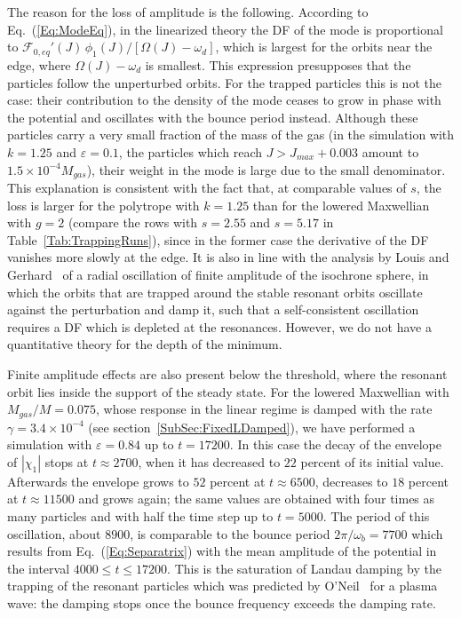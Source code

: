 The reason for the loss of amplitude is the following. According to Eq.~(\ref{Eq:ModeEq}), in the linearized theory the DF of the mode is proportional to $\mathcal{F}_{0,eq}'(J)\,\phi_1(J)/[\Omega(J) - \omega_d]$, which is largest for the orbits near the edge, where $\Omega(J) - \omega_d$ is smallest. This expression presupposes that the particles follow the unperturbed orbits. For the trapped particles this is not the case: their contribution to the density of the mode ceases to grow in phase with the potential and oscillates with the bounce period instead. Although these particles carry a very small fraction of the mass of the gas (in the simulation with $k = 1.25$ and $\varepsilon = 0.1$, the particles which reach $J > J_{max} + 0.003$ amount to $1.5\times 10^{-4} M_{gas}$), their weight in the mode is large due to the small denominator. This explanation is consistent with the fact that, at comparable values of $s$, the loss is larger for the polytrope with $k = 1.25$ than for the lowered Maxwellian with $g = 2$ (compare the rows with $s = 2.55$ and $s = 5.17$ in Table~\ref{Tab:TrappingRuns}), since in the former case the derivative of the DF vanishes more slowly at the edge. It is also in line with the analysis by Louis and Gerhard~\cite{pLoG88} of a radial oscillation of finite amplitude of the isochrone sphere, in which the orbits that are trapped around the stable resonant orbits oscillate against the perturbation and damp it, such that a self-consistent oscillation requires a DF which is depleted at the resonances. However, we do not have a quantitative theory for the depth of the minimum.

Finite amplitude effects are also present below the threshold, where the resonant orbit lies inside the support of the steady state. For the lowered Maxwellian with $M_{gas}/M = 0.075$, whose response in the linear regime is damped with the rate $\gamma = 3.4\times 10^{-4}$ (see section~\ref{SubSec:FixedLDamped}), we have performed a simulation with $\varepsilon = 0.84$ up to $t = 17200$. In this case the decay of the envelope of $|\chi_1|$ stops at $t\approx 2700$, when it has decreased to $22$ percent of its initial value. Afterwards the envelope grows to $52$ percent at $t\approx 6500$, decreases to $18$ percent at $t\approx 11500$ and grows again; the same values are obtained with four times as many particles and with half the time step up to $t = 5000$. The period of this oscillation, about $8900$, is comparable to the bounce period $2\pi/\omega_b = 7700$ which results from Eq.~(\ref{Eq:Separatrix}) with the mean amplitude of the potential in the interval $4000\leq t\leq 17200$. This is the saturation of Landau damping by the trapping of the resonant particles which was predicted by O'Neil~\cite{tO65} for a plasma wave: the damping stops once the bounce frequency exceeds the damping rate.

